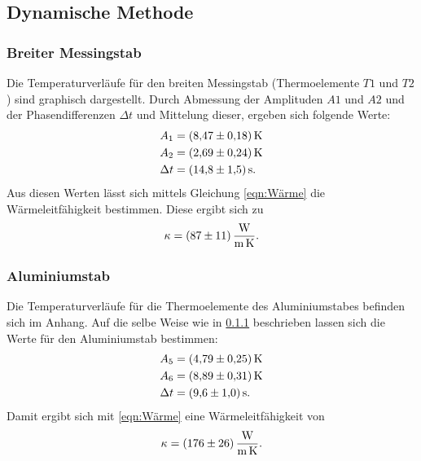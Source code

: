 \subsection{Dynamische Methode}
\subsubsection{Breiter Messingstab}
\label{sec:messing}




Die Temperaturverläufe für den breiten Messingstab (Thermoelemente $T1$ und $T2$)
sind graphisch dargestellt. %
\newline
Durch Abmessung der Amplituden $A1$ und $A2$ und der Phasendifferenzen $\Delta t$ 
und Mittelung dieser, ergeben sich folgende Werte:
\begin{align*}
    A_{1} &= \SI{8.47 \pm 0.18}{\kelvin} \\
    A_{2} &= \SI{2.69 \pm 0.24}{\kelvin} \\
    \Delta t &= \SI{14.8 \pm 1.5}{\second}.
\end{align*}
Aus diesen Werten lässt sich mittels Gleichung \eqref{eqn:Wärme} die Wärmeleitfähigkeit
bestimmen. Diese ergibt sich zu
\begin{equation*}
    \kappa = \SI{87 \pm 11}{\watt\per\meter\per\kelvin}.
\end{equation*}

\subsubsection{Aluminiumstab}




Die Temperaturverläufe für die Thermoelemente des Aluminiumstabes befinden sich im Anhang. %
Auf die selbe Weise wie in \ref{sec:messing} beschrieben lassen sich die Werte
für den Aluminiumstab bestimmen:
\begin{align*}
    A_{5} &= \SI{4.79 \pm 0.25}{\kelvin} \\
    A_{6} &= \SI{8.89 \pm 0.31}{\kelvin} \\
    \Delta t &= \SI{9.6 \pm 1.0}{\second}.
\end{align*}
Damit ergibt sich mit \eqref{eqn:Wärme} eine Wärmeleitfähigkeit von
\begin{equation*}
    \kappa = \SI{176 \pm 26}{\watt\per\meter\per\kelvin}.
\end{equation*}

